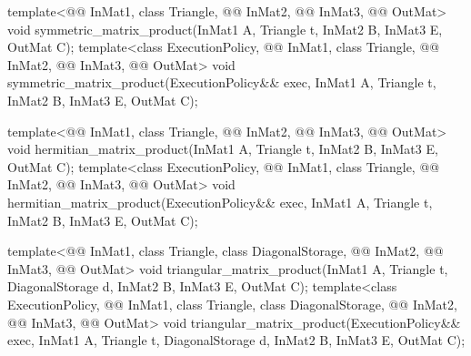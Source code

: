 \begin{itemdecl}
template<@@ InMat1, class Triangle, @@ InMat2, @@ InMat3,
         @@ OutMat>
  void symmetric_matrix_product(InMat1 A, Triangle t, InMat2 B, InMat3 E, OutMat C);
template<class ExecutionPolicy,
         @@ InMat1, class Triangle, @@ InMat2, @@ InMat3,
         @@ OutMat>
  void symmetric_matrix_product(ExecutionPolicy&& exec,
                                InMat1 A, Triangle t, InMat2 B, InMat3 E, OutMat C);

template<@@ InMat1, class Triangle, @@ InMat2, @@ InMat3,
         @@ OutMat>
  void hermitian_matrix_product(InMat1 A, Triangle t, InMat2 B, InMat3 E, OutMat C);
template<class ExecutionPolicy,
         @@ InMat1, class Triangle, @@ InMat2, @@ InMat3,
         @@ OutMat>
  void hermitian_matrix_product(ExecutionPolicy&& exec,
                                InMat1 A, Triangle t, InMat2 B, InMat3 E, OutMat C);

template<@@ InMat1, class Triangle, class DiagonalStorage,
         @@ InMat2, @@ InMat3, @@ OutMat>
  void triangular_matrix_product(InMat1 A, Triangle t, DiagonalStorage d, InMat2 B, InMat3 E,
                                 OutMat C);
template<class ExecutionPolicy,
         @@ InMat1, class Triangle, class DiagonalStorage,
         @@ InMat2, @@ InMat3, @@ OutMat>
  void triangular_matrix_product(ExecutionPolicy&& exec,
                                 InMat1 A, Triangle t, DiagonalStorage d, InMat2 B, InMat3 E,
                                 OutMat C);
\end{itemdecl}

